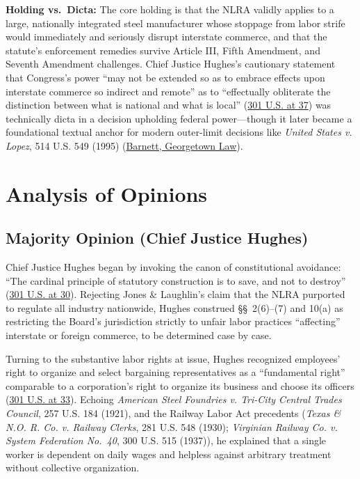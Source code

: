 \documentclass[12pt]{article}
\begin{document}
\textbf{Holding vs.\ Dicta:} The core holding is that the NLRA validly applies to a large, nationally integrated steel manufacturer whose stoppage from labor strife would immediately and seriously disrupt interstate commerce, and that the statute's enforcement remedies survive Article III, Fifth Amendment, and Seventh Amendment challenges. Chief Justice Hughes's cautionary statement that Congress's power ``may not be extended so as to embrace effects upon interstate commerce so indirect and remote'' as to ``effectually obliterate the distinction between what is national and what is local'' (\href{https://supreme.justia.com/cases/federal/us/301/1/}{301 U.S. at 37}) was technically dicta in a decision upholding federal power---though it later became a foundational textual anchor for modern outer-limit decisions like \textit{United States v. Lopez}, 514 U.S. 549 (1995) (\href{https://scholarship.law.georgetown.edu/cgi/viewcontent.cgi?article=1433&context=facpub&sei-redir=1}{Barnett, Georgetown Law}).

\section{Analysis of Opinions}

\subsection{Majority Opinion (Chief Justice Hughes)}

Chief Justice Hughes began by invoking the canon of constitutional avoidance: ``The cardinal principle of statutory construction is to save, and not to destroy'' (\href{https://supreme.justia.com/cases/federal/us/301/1/}{301 U.S. at 30}). Rejecting Jones \& Laughlin's claim that the NLRA purported to regulate all industry nationwide, Hughes construed \S\S~2(6)--(7) and 10(a) as restricting the Board's jurisdiction strictly to unfair labor practices ``affecting'' interstate or foreign commerce, to be determined case by case.

Turning to the substantive labor rights at issue, Hughes recognized employees' right to organize and select bargaining representatives as a ``fundamental right'' comparable to a corporation's right to organize its business and choose its officers (\href{https://supreme.justia.com/cases/federal/us/301/1/}{301 U.S. at 33}). Echoing \textit{American Steel Foundries v. Tri-City Central Trades Council}, 257 U.S. 184 (1921), and the Railway Labor Act precedents (\textit{Texas \& N.O. R. Co. v. Railway Clerks}, 281 U.S. 548 (1930); \textit{Virginian Railway Co. v. System Federation No.\ 40}, 300 U.S. 515 (1937)), he explained that a single worker is dependent on daily wages and helpless against arbitrary treatment without collective organization.
\end{document}

